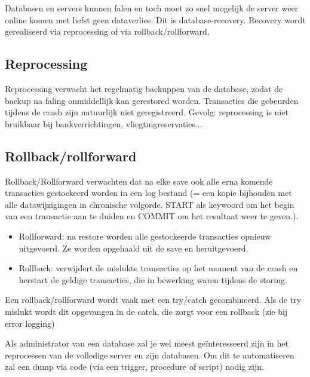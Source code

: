 \documentclass{article}
\begin{document}
Databasen en servers kunnen falen en toch moet zo snel mogelijk de server weer online komen met liefst geen
dataverlies. Dit is database-recovery. Recovery wordt gerealiseerd via reprocessing of via rollback/rollforward.

\subsection{Reprocessing}
Reprocessing verwacht het regelmatig backuppen van de database, zodat de backup na faling onmiddellijk
kan gerestored worden. Transacties die gebeurden tijdens de crash zijn natuurlijk niet geregistreerd.
Gevolg: reprocessing is niet bruikbaar bij bankverrichtingen, vliegtuigreservaties...


\subsection{Rollback/rollforward}
Rollback/Rollforward verwachten dat na elke save ook alle erna komende transacties gestockeerd worden
in een log bestand (= een kopie bijhouden met alle datawijzigingen in chronische volgorde. START als
keywoord om het begin van een transactie aan te duiden en COMMIT om het resultaat weer te geven.).

\begin{itemize}
    \item Rollforward: na restore worden alle gestockeerde transacties opnieuw uitgevoerd. Ze worden opgehaald uit de save en heruitgevoerd.
    \item Rollback: verwijdert de mislukte transacties op het moment van de crash en herstart de geldige transacties, die in bewerking waren tijdens de storing.
\end{itemize}

Een rollback/rollforward wordt vaak met een try/catch gecombineerd. Als de try mislukt wordt dit opgevangen in de
catch, die zorgt voor een rollback (zie bij error logging)

Als administrator van een database zal je wel meest geïnteresseerd zijn in het reprocessen van de volledige server
en zijn databasen. Om dit te automatiseren zal een dump via code (via een trigger, procedure of script) nodig zijn.
\end{document}
